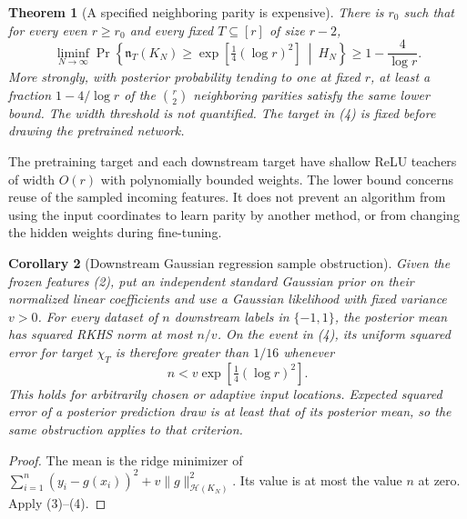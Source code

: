 \documentclass[11pt]{article}
\newtheorem{theorem}{Theorem}\newtheorem{lemma}[theorem]{Lemma}
\newtheorem{corollary}[theorem]{Corollary}
\begin{document}
\begin{theorem}[A specified neighboring parity is expensive]
There is $r_0$ such that for every even $r\ge r_0$ and every fixed
$T\subseteq[r]$ of size $r-2$,
\[
 \liminf_{N\to\infty}
 \Pr\left\{\mathfrak n_T(K_N)\ge
                  \exp\left[\tfrac14(\log r)^2\right]\ \middle|\ H_N\right\}
                       \ge1-\frac4{\log r}.              \tag{4}
\]
More strongly, with posterior probability tending to one at fixed $r$,
at least a fraction $1-4/\log r$ of the $\binom r2$ neighboring parities
satisfy the same lower bound.
The width threshold is not quantified. The target in (4) is fixed
before drawing the pretrained network.
\end{theorem}

The pretraining target and each downstream target have shallow ReLU
teachers of width $O(r)$ with polynomially bounded weights. The lower
bound concerns reuse of the sampled incoming features. It does not
prevent an algorithm from using the input coordinates to learn parity
by another method, or from changing the hidden weights during fine-tuning.

\begin{corollary}[Downstream Gaussian regression sample obstruction]
Given the frozen features (2), put an independent standard Gaussian prior
on their normalized linear coefficients and use a Gaussian likelihood
with fixed variance $v>0$. For every dataset of $n$ downstream labels in
$\{-1,1\}$, the posterior mean has squared RKHS norm at most $n/v$.
On the event in (4), its uniform squared error for target $\chi_T$ is
therefore greater than $1/16$ whenever
\[
                   n<v\exp[\tfrac14(\log r)^2].
 \tag{5}
\]
This holds for arbitrarily chosen or adaptive input locations. Expected
squared error of a posterior prediction draw is at least that of its
posterior mean, so the same obstruction applies to that criterion.
\end{corollary}
\begin{proof}
The mean is the ridge minimizer of
$\sum_{i=1}^n(y_i-g(x_i))^2+v\|g\|_{\mathcal H(K_N)}^2$.
Its value is at most the value $n$ at zero. Apply (3)--(4).
\end{proof}
\end{document}
